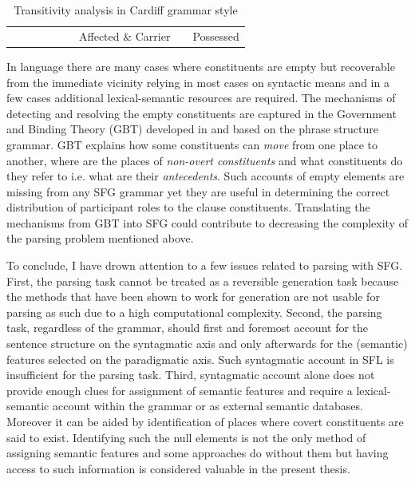\begin{table}[!ht]
{\begin{tabular}{cccccc|c|c|c|c|c|}
            &                             &                                      &                         &                                     &                & Affected \& Carrier &                  & \multicolumn{3}{c|}{Possessed}                 \\ \cline{7-7} \cline{9-11} 
        \end{tabular}%
    }
    \caption{Transitivity analysis in Cardiff grammar style \citep{Neale2002,Fawcett2009}}
    \label{tab:glance-analsys-semantic}
\end{table}

In language there are many cases where constituents are empty but recoverable from the immediate vicinity relying in most cases on syntactic means and in a few cases additional lexical-semantic resources are required. The mechanisms of detecting and resolving the empty constituents are captured in the Government and Binding Theory (GBT) developed in \citep{Chomsky81, Chomsky1982, Chomsky1986} and based on the phrase structure grammar. GBT explains how some constituents can \textit{move} from one place to another, where are the places of \textit{non-overt constituents} and what constituents do they refer to i.e. what are their \textit{antecedents}. Such accounts of empty elements are missing from any SFG grammar yet they are useful in determining the correct distribution of participant roles to the clause constituents. Translating the mechanisms from GBT into SFG could contribute to decreasing the complexity of the parsing problem mentioned above.


To conclude, I have drown attention to a few issues related to parsing with SFG. First, the parsing task cannot be treated as a reversible generation task because the methods that have been shown to work for generation are not usable for parsing as such due to a high computational complexity. Second, the parsing task, regardless of the grammar, should first and foremost account for the sentence structure on the syntagmatic axis and only afterwards for the (semantic) features selected on the paradigmatic axis. Such syntagmatic account in SFL is insufficient for the parsing task. Third, syntagmatic account alone does not provide enough clues for assignment of semantic features and require a lexical-semantic account within the grammar or as external semantic databases. Moreover it can be aided by identification of places where covert constituents are said to exist. Identifying such the null elements is not the only method of assigning semantic features and some approaches do without them but having access to such information is considered valuable in the present thesis.

